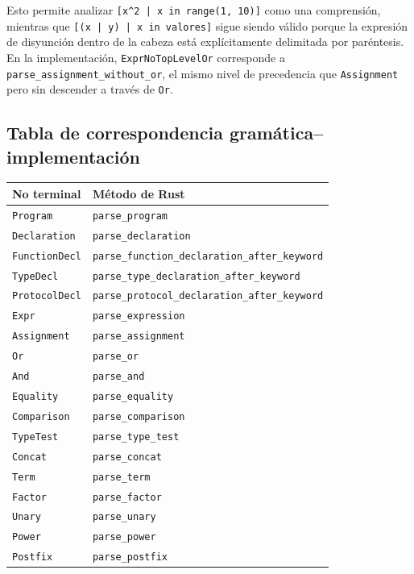 \documentclass[12pt, a4paper]{article}
\begin{document}
Esto permite analizar \texttt{[x\^{}2 | x in range(1, 10)]} como una
comprensión, mientras que \texttt{[(x | y) | x in valores]} sigue siendo
válido porque la expresión de disyunción dentro de la cabeza está
explícitamente delimitada por paréntesis. En la implementación,
\texttt{ExprNoTopLevelOr} corresponde a \texttt{parse\_assignment\_without\_or},
el mismo nivel de precedencia que \texttt{Assignment} pero sin descender a
través de \texttt{Or}.

\subsection{Tabla de correspondencia gramática--implementación}

\begin{center}
\begin{longtable}{@{}l l@{}}
\toprule
\textbf{No terminal} & \textbf{Método de Rust} \\
\midrule
\endhead
\texttt{Program} & \texttt{parse\_program} \\
\texttt{Declaration} & \texttt{parse\_declaration} \\
\texttt{FunctionDecl} & \texttt{parse\_function\_declaration\_after\_keyword} \\
\texttt{TypeDecl} & \texttt{parse\_type\_declaration\_after\_keyword} \\
\texttt{ProtocolDecl} & \texttt{parse\_protocol\_declaration\_after\_keyword} \\
\texttt{Expr} & \texttt{parse\_expression} \\
\texttt{Assignment} & \texttt{parse\_assignment} \\
\texttt{Or} & \texttt{parse\_or} \\
\texttt{And} & \texttt{parse\_and} \\
\texttt{Equality} & \texttt{parse\_equality} \\
\texttt{Comparison} & \texttt{parse\_comparison} \\
\texttt{TypeTest} & \texttt{parse\_type\_test} \\
\texttt{Concat} & \texttt{parse\_concat} \\
\texttt{Term} & \texttt{parse\_term} \\
\texttt{Factor} & \texttt{parse\_factor} \\
\texttt{Unary} & \texttt{parse\_unary} \\
\texttt{Power} & \texttt{parse\_power} \\
\texttt{Postfix} & \texttt{parse\_postfix} \\

\end{longtable}
\end{center}
\end{document}
